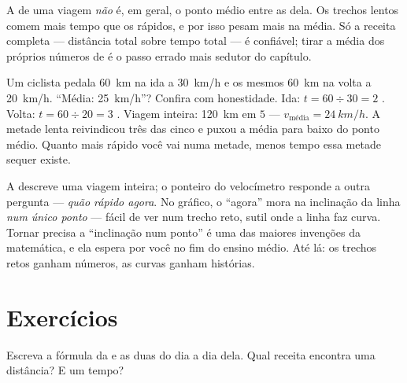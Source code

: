 \begin{proposition}[A armadilha]\label{prop:g7:motion-average-speed:trap}
A  de uma viagem \emph{não} é, em geral, o ponto
médio entre as  dela. Os trechos lentos comem mais tempo
que os rápidos, e por isso pesam mais na média. Só a receita completa
--- distância total sobre tempo total --- é confiável; tirar a média
dos próprios números de  é o passo errado mais sedutor do
capítulo.
\end{proposition}

\begin{example}\label{ex:g7:motion-average-speed:sprung}
Um ciclista pedala \qty{60}{km} na ida a \qty{30}{km/h} e os mesmos
\qty{60}{km} na volta a \qty{20}{km/h}. ``Média: \qty{25}{km/h}''?
Confira com honestidade. Ida: $t = 60 \div 30 = 2$ . Volta:
$t = 60 \div 20 = 3$ . Viagem inteira: \qty{120}{km} em $5$
 --- $v_{\text{média}} = \qty{24}{km/h}$. A metade lenta
reivindicou três das cinco  e puxou a média para baixo do ponto
médio. Quanto mais rápido você vai numa metade, menos tempo essa
metade sequer existe.
\end{example}

\begin{remark}\label{rem:g7:motion-average-speed:speedometer}
A  descreve uma viagem inteira; o ponteiro do
velocímetro responde a outra pergunta --- \emph{quão rápido agora}.
No gráfico, o ``agora'' mora na inclinação da linha \emph{num único
ponto} --- fácil de ver num trecho reto, sutil onde a linha faz
curva. Tornar precisa a ``inclinação num ponto'' é uma das maiores
invenções da matemática, e ela espera por você no fim do ensino
médio. Até lá: os trechos retos ganham números, as curvas ganham
histórias.
\end{remark}

\section{Exercícios}

\begin{exercise}[$\star$]\label{exo:g7:motion-average-speed:1}
Escreva a fórmula da  e as duas  do dia a dia dela.
Qual receita encontra uma distância? E um tempo?
\end{exercise}

